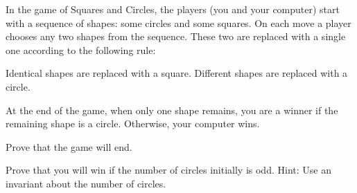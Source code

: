\documentclass[12pt,oneside]{article}
\begin{document}
\begin{problem}{20}

In the game of Squares and Circles, the players (you and your computer) start with a sequence of shapes: some circles and some squares. On each move a player chooses any two shapes from the sequence. These two are replaced with a single one according to the following rule:

Identical shapes are replaced with a square. Different shapes are replaced with a circle.

At the end of the game, when only one shape remains, you are a winner if the remaining shape is a circle. Otherwise, your computer wins. 

\bparts

Prove that the game will end.


Prove that you will win if the number of circles initially is odd. Hint: Use an invariant about the number of circles.
 

\eparts

\end{problem}

\newcommand{\card}[1]{\left|#1\right|}


\newpage
\end{document}
